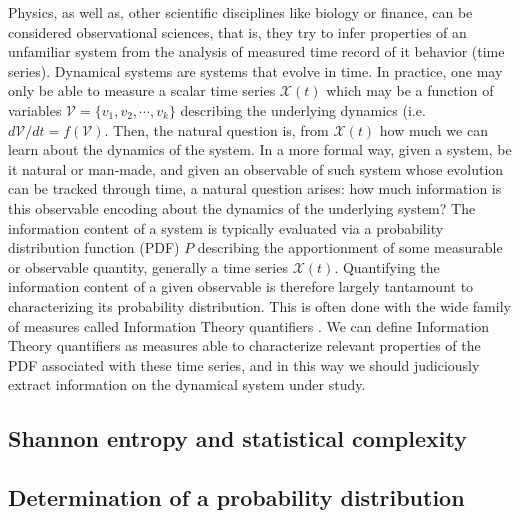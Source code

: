 Physics, as well as, other scientific disciplines like biology or finance, can be considered observational sciences, that is, they try to infer  properties of an unfamiliar system from  the analysis of measured time record of it behavior (time series).  
Dynamical systems are systems that evolve in time.
In practice, one may only be able to measure a scalar time series ${\mathcal X}(t)$ which may be a function of variables ${\mathcal V}=\{ v_1,  v_2,\cdots, v_k\}$ describing the underlying dynamics (i.e. $d{\mathcal V}/dt=f({\mathcal V})$.
Then, the natural question is, from ${\mathcal X}(t)$ how much  we can learn about the dynamics of the system.
In a  more formal way, given a system, be it natural or man-made, and given an observable of such system whose evolution can be tracked through time, a natural question arises: how much information is this observable encoding about the dynamics of the underlying system? 
The information content of a system is typically evaluated via a probability distribution function (PDF) $P$ describing the apportionment of some measurable or observable quantity, generally a time series ${\mathcal X}(t)$. 
Quantifying the information content of a given observable is therefore largely tantamount to characterizing its probability distribution. 
This is often done with the wide family of measures called Information Theory quantifiers \cite{Gray1990}.
We can define Information Theory quantifiers as measures able to characterize relevant properties of the PDF associated with these time series, and in this way we should judiciously extract information on the dynamical system under study.

\subsection{Shannon entropy and statistical complexity}



\subsection{Determination of a probability distribution}


